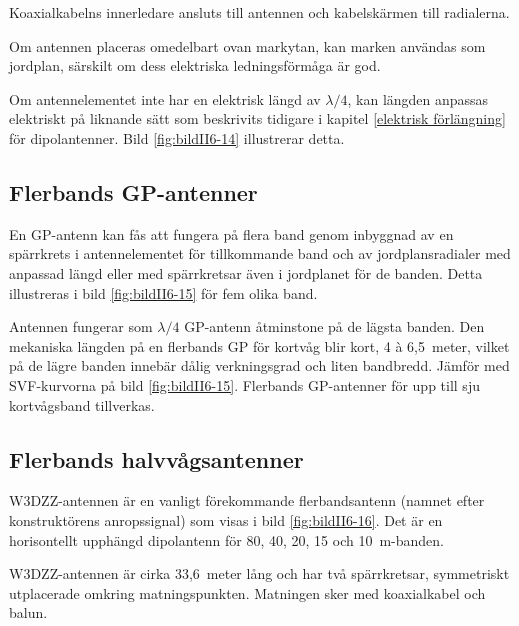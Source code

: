 Koaxialkabelns innerledare ansluts till antennen och kabelskärmen till
radialerna.

Om antennen placeras omedelbart ovan markytan, kan marken användas som
jordplan, särskilt om dess elektriska ledningsförmåga är god.

Om antennelementet inte har en elektrisk längd av \(\lambda/4\), kan
längden anpassas elektriskt på liknande sätt som beskrivits tidigare i
kapitel \ref{elektrisk förlängning} för dipolantenner.
Bild \ref{fig:bildII6-14} illustrerar detta.


\newpage
\subsection{Flerbands GP-antenner}

En GP-antenn kan fås att fungera på flera band genom inbyggnad av en spärrkrets
i antennelementet för tillkommande band och av jordplansradialer med anpassad
längd eller med spärrkretsar även i jordplanet för de banden.
Detta illustreras i bild \ref{fig:bildII6-15} för fem olika band.

Antennen fungerar som \(\lambda/4\) GP-antenn åtminstone på de lägsta banden.
Den mekaniska längden på en flerbands GP för kortvåg blir kort, 4 à 6,5~meter,
vilket på de lägre banden innebär dålig verkningsgrad och liten bandbredd.
Jämför med SVF-kurvorna på bild \ref{fig:bildII6-15}.
Flerbands GP-antenner för upp till sju kortvågsband tillverkas.

\clearpage
\subsection{Flerbands halvvågsantenner}
\label{W3DZZ}


W3DZZ-antennen är en vanligt förekommande flerbandsantenn (namnet
efter konstruktörens anropssignal) som visas i bild \ref{fig:bildII6-16}.
Det är en horisontellt upphängd dipolantenn för 80, 40, 20, 15 och
10~m-banden.

W3DZZ-antennen är cirka 33,6~meter lång och har två spärrkretsar,
symmetriskt utplacerade omkring matningspunkten.
Matningen sker med koaxialkabel och balun.

